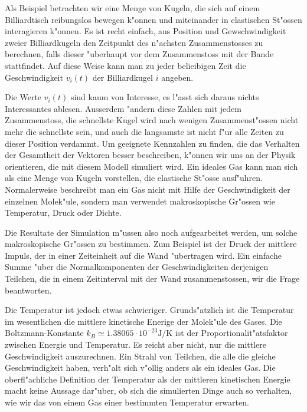 \begin{beispiel}
Als Beispiel betrachten wir eine Menge von Kugeln, die sich auf einem
Billiardtisch reibungslos bewegen k"onnen und miteinander in elastischen
St"ossen interagieren k"onnen. Es ist recht einfach, aus Position und
Gewschwindigkeit zweier
Billiardkugeln den Zeitpunkt des n"achsten Zusammenstosses zu berechnen,
falls dieser "uberhaupt vor dem Zusammenstoss mit der Bande stattfindet.
Auf diese Weise kann man zu jeder belieibigen Zeit die Geschwindigkeit
$v_i(t)$ der Billiardkugel $i$ angeben.

Die Werte $v_i(t)$ sind kaum von Interesse, es l"asst sich daraus nichts
Interessantes ablesen.
Ausserdem "andern diese Zahlen mit jedem Zusammenstoss, die schnellste
Kugel wird nach wenigen Zusammenst"ossen nicht mehr die schnellste sein,
und auch die langsamste ist nicht f"ur alle Zeiten zu dieser Position
verdammt.
Um geeignete Kennzahlen zu finden, die das Verhalten der Gesamtheit
der Vektoren besser beschreiben, k"onnen wir uns an der Physik orientieren,
die mit diesem Modell simuliert wird.
Ein ideales Gas kann man sich als eine Menge von Kugeln vorstellen,
die elastische St"osse ausf"uhren.
Normalerweise beschreibt man ein Gas nicht mit Hilfe der Geschwindigkeit
der einzelnen Molek"ule, sondern man verwendet makroskopische Gr"ossen
wie Temperatur, Druck oder Dichte.

Die Resultate der Simulation m"ussen also noch aufgearbeitet werden, um
solche makroskopische Gr"ossen zu bestimmen.
Zum Beispiel ist der Druck der mittlere Impuls, der in einer Zeiteinheit
auf die Wand "ubertragen wird.
Ein einfache Summe "uber die Normalkomponenten der Geschwindigkeiten
derjenigen Teilchen, die in einem Zeitinterval mit der Wand zusammenstossen,
wir die Frage beantworten.

Die Temperatur ist jedoch etwas schwieriger.
Grunds"atzlich ist die Temperatur im wesentlichen die mittlere 
kinetische Enerige der Molek"ule des Gases. Die Boltzmann-Konstante
$k_B\simeq 1.38065\cdot10^{-23} \text{J/K}$ ist der Proportionalit"atsfaktor
zwischen Energie und Temperatur.
Es reicht aber nicht,
nur die mittlere Geschwindigkeit auszurechnen.
Ein Strahl von Teilchen, die alle die gleiche Geschwindigkeit haben,
verh"alt sich v"ollig anders als ein ideales Gas.
Die oberfl"achliche Definition der Temperatur als der mittleren
kinetischen Energie macht keine Aussage dar"uber, ob sich die
simulierten Dinge auch so verhalten, wie wir das von einem
Gas einer bestimmten Temperatur erwarten.


\end{beispiel}
